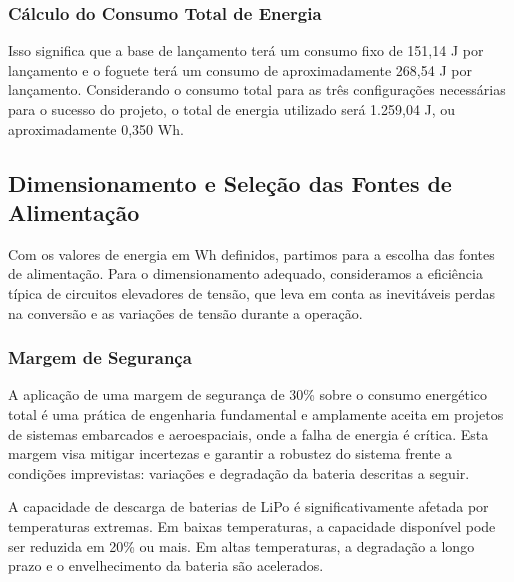 \subsubsection{Cálculo do Consumo Total de Energia}

Isso significa que a base de lançamento terá um consumo fixo de 151,14 J por lançamento e o foguete terá um consumo de aproximadamente 268,54 J por lançamento. Considerando o consumo total para as três configurações necessárias para o sucesso do projeto, o total de energia utilizado será 1.259,04 J, ou aproximadamente 0,350 Wh. 

\subsection{Dimensionamento e Seleção das Fontes de Alimentação}

Com os valores de energia em Wh definidos, partimos para a escolha das fontes de alimentação. Para o dimensionamento adequado, consideramos a eficiência típica de circuitos elevadores de tensão, que leva em conta as inevitáveis perdas na conversão e as variações de tensão durante a operação.


\subsubsection{Margem de Segurança}

A aplicação de uma margem de segurança de 30\% sobre o consumo energético total é uma prática de engenharia fundamental e amplamente aceita em projetos de sistemas embarcados e aeroespaciais, onde a falha de energia é crítica. Esta margem visa mitigar incertezas e garantir a robustez do sistema frente a condições imprevistas: variações e degradação da bateria descritas a seguir.

A capacidade de descarga de baterias de LiPo é significativamente afetada por temperaturas extremas. Em baixas temperaturas, a capacidade disponível pode ser reduzida em 20\% ou mais. Em altas temperaturas, a degradação a longo prazo e o envelhecimento da bateria são acelerados.\cite{plett2015}

